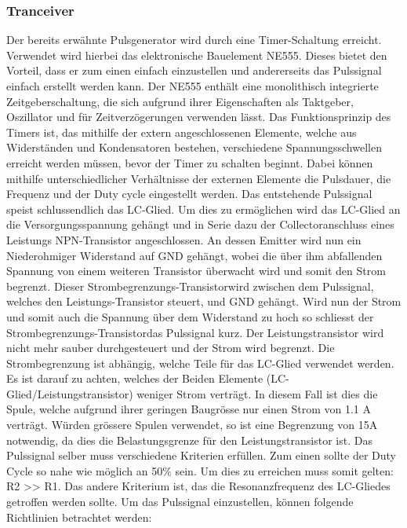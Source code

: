 \subsubsection*{Tranceiver}
Der bereits erwähnte Pulsgenerator wird durch eine Timer-Schaltung erreicht. Verwendet wird hierbei das elektronische Bauelement NE555. Dieses bietet den Vorteil, dass er zum einen einfach einzustellen und andererseits das Pulssignal einfach erstellt werden kann. Der NE555 enthält eine monolithisch integrierte Zeitgeberschaltung, die sich aufgrund ihrer Eigenschaften als Taktgeber, Oszillator und für Zeitverzögerungen verwenden lässt. Das Funktionsprinzip des Timers ist, das mithilfe der extern angeschlossenen Elemente, welche aus Widerständen und Kondensatoren bestehen, verschiedene Spannungsschwellen erreicht werden müssen, bevor der Timer zu schalten beginnt. Dabei können mithilfe unterschiedlicher Verhältnisse der externen Elemente die Pulsdauer, die Frequenz und der Duty cycle eingestellt werden. Das entstehende Pulssignal speist schlussendlich das LC-Glied. Um dies zu ermöglichen wird das LC-Glied an die Versorgungsspannung gehängt und in Serie dazu der Collectoranschluss eines Leistungs NPN-Transistor angeschlossen. An dessen Emitter wird nun ein Niederohmiger Widerstand auf GND gehängt, wobei die über ihm abfallenden Spannung von einem weiteren Transistor überwacht wird und somit den Strom begrenzt. Dieser \glqq Strombegrenzungs-Transistor\grqq wird zwischen dem Pulssignal, welches den Leistungs-Transistor steuert, und GND gehängt. Wird nun der Strom und somit auch die Spannung über dem Widerstand zu hoch so schliesst der \glqq Strombegrenzungs-Transistor\grqq das Pulssignal kurz. Der Leistungstransistor wird nicht mehr sauber durchgesteuert und der Strom wird begrenzt. Die Strombegrenzung ist abhängig, welche Teile für das LC-Glied verwendet werden. Es ist darauf zu achten, welches der Beiden Elemente (LC-Glied/Leistungstransistor) weniger Strom verträgt. In diesem Fall ist dies die Spule, welche aufgrund ihrer geringen Baugrösse nur einen Strom von 1.1 A verträgt. Würden grössere Spulen verwendet, so ist eine Begrenzung von 15A notwendig, da dies die Belastungsgrenze für den Leistungstransistor ist.
\newline
Das Pulssignal selber muss verschiedene Kriterien erfüllen. Zum einen sollte der Duty Cycle so nahe wie möglich an 50$\%$ sein. Um dies zu erreichen muss somit gelten: R2 >> R1. Das andere Kriterium ist, das die Resonanzfrequenz des LC-Gliedes getroffen werden sollte. Um das Pulssignal einzustellen, können folgende Richtlinien betrachtet werden:


